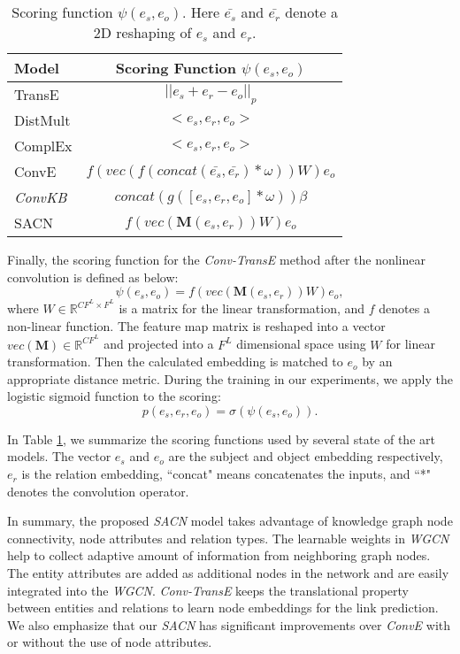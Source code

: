 \documentclass[letterpaper]{article} \usepackage{aaai19}  \usepackage{times}  \usepackage{helvet}  \usepackage{courier}  \usepackage{url}  \usepackage{graphicx}  \usepackage{amsmath}
\begin{document}
\begin{table}[t]
	\caption{Scoring function $\psi(e_s, e_o)$. Here $\bar{e_s}$ and $\bar{e_r}$ denote a 2D reshaping of $e_s$ and $e_r$.}
	\label{tbl:scoring}
	\smallskip
	\begin{center}
\begin{tabular}{|l|c|}
\hline
			Model & Scoring Function $\psi(e_s, e_o)$\\
			\hline
TransE 	 & $||e_s + e_r - e_o||_p$  \\
			DistMult 	 & $<e_s, e_r, e_o>$  \\
			ComplEx  & $<e_s, e_r, e_o>$  \\
			ConvE 	 &  $  f( vec( f(concat(\bar{e_s}, \bar{e_r}) * \omega )) W )e_o  $   \\
			{\it ConvKB}  & $concat(g([e_s, e_r, e_o]* \omega)) \beta$ \\
			SACN  & $f(vec(\mathbf{M}(e_s, e_r)) W )e_o$ \\
			\hline
\end{tabular}
	\end{center}
	\vskip -0.25in
\end{table}

Finally, the scoring function for the {\it Conv-TransE} method after the nonlinear convolution is defined as below:
\begin{equation} 
\psi(e_s, e_o) = f(vec(\mathbf{M}(e_s, e_r)) W )e_o,
\end{equation}
where $W \in \mathbb{R}^{CF^{L} \times F^{L}}$ is a matrix for the linear transformation, and $f$ denotes a non-linear function. The feature map matrix is reshaped into a vector $vec(\mathbf{M}) \in \mathbb{R}^{C F^{L}}$ and projected into a $F^{L}$ dimensional space using $W$ for linear transformation. Then the calculated embedding is matched to $e_o$ by an appropriate distance metric. During the training in our experiments, we apply the logistic sigmoid function to the scoring:
\begin{equation} 
p(e_s, e_r, e_o) = \sigma(\psi(e_s, e_o)).
\end{equation}

In Table \ref{tbl:scoring}, we summarize the scoring functions used by several state of the art models. The vector $e_s$ and $e_o$ are the subject and object embedding respectively, $e_r$ is the relation embedding, ``concat" means concatenates the inputs, and ``*" denotes the convolution operator.


In summary, the proposed {\it SACN} model takes advantage of knowledge graph node connectivity, node attributes and relation types. The learnable weights in {\it WGCN} help to collect adaptive amount of information from neighboring graph nodes. The entity attributes are added as additional nodes in the network and are easily integrated into the {\it WGCN}. {\it Conv-TransE} keeps the translational property between entities and relations to learn node embeddings for the link prediction.
We also emphasize that our {\it SACN} has significant improvements over {\it ConvE} with or without the use of node attributes.
\end{document}
